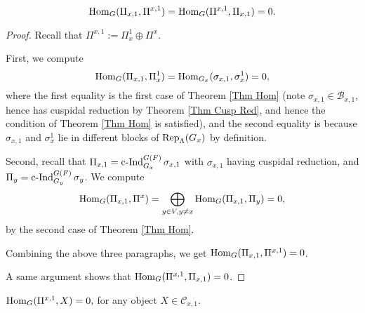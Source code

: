 	

	
	\begin{lemma}\label{Lem Ortho}
		$$\operatorname{\operatorname{Hom}}_G(\Pi_{x,1}, \Pi^{x,1})=\operatorname{\operatorname{Hom}}_G(\Pi^{x,1}, \Pi_{x,1})=0.$$
	\end{lemma}
	
	\begin{proof}
		Recall that
		$\Pi^{x,1}:=\Pi_x^1 \oplus \Pi^x$.
		
		First, we compute
		$$\operatorname{\operatorname{Hom}}_G(\Pi_{x,1}, \Pi_x^1)=\operatorname{\operatorname{Hom}}_{G_x}(\sigma_{x,1}, \sigma_x^1)=0,$$
		where the first equality is the first case of Theorem \ref{Thm Hom} (note $\sigma_{x,1} \in \mathcal{B}_{x,1}$, hence has cuspidal reduction by Theorem \ref{Thm Cusp Red}, and hence the condition of Theorem \ref{Thm Hom} is satisfied), and the second equality is because $\sigma_{x,1}$ and $\sigma_x^1$ lie in different blocks of $\operatorname{\operatorname{Rep}}_{\Lambda}(G_x)$ by definition.
		
		Second, recall that $\Pi_{x,1}=\operatorname{\operatorname{c-Ind}}_{G_x}^{G(F)}\sigma_{x,1}$ with $\sigma_{x,1}$ having cuspidal reduction, and $\Pi_y=\operatorname{\operatorname{c-Ind}}_{G_y}^{G(F)}\sigma_y$. We compute 
		$$\operatorname{\operatorname{Hom}}_G(\Pi_{x,1}, \Pi^x)=\bigoplus_{y \in V, y \neq x}\operatorname{\operatorname{Hom}}_G(\Pi_{x,1}, \Pi_y)=0,$$
		by the second case of Theorem \ref{Thm Hom}.
		
		Combining the above three paragraphs, we get $\operatorname{\operatorname{Hom}}_G(\Pi_{x,1}, \Pi^{x,1})=0$.
		
		A same argument shows that $\operatorname{\operatorname{Hom}}_G(\Pi^{x,1}, \Pi_{x,1})=0$.
	\end{proof}
	
	\begin{lemma}\label{Lem Gen}
		$\operatorname{\operatorname{Hom}}_G(\Pi^{x,1}, X)=0,$
		for any object $X \in \mathcal{C}_{x,1}$.
	\end{lemma}
	
